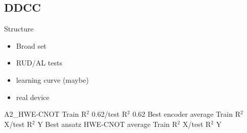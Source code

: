 \documentclass[journal=jacsat,manuscript=article]{achemso}
\begin{document}
\begin{figure}[H]
\begin{subfigure}[b]{0.49\textwidth}
		\caption{}
		\label{fig:BSE16_learningcurve}
	\end{subfigure}
	\caption{}
	\label{fig:BSE_LC}	
\end{figure}







\subsection{DDCC}
Structure
\begin{itemize}
	\item Broad set
	\item RUD/AL tests
	\item learning curve (maybe)
	\item real device 
\end{itemize}

A2\_HWE-CNOT Train R$^{2}$ 0.62/test R$^{2}$ 0.62 
Best encoder average Train R$^{2}$ X/test R$^{2}$ Y
Best ansatz HWE-CNOT average Train R$^{2}$ X/test R$^{2}$ Y
\end{document}
